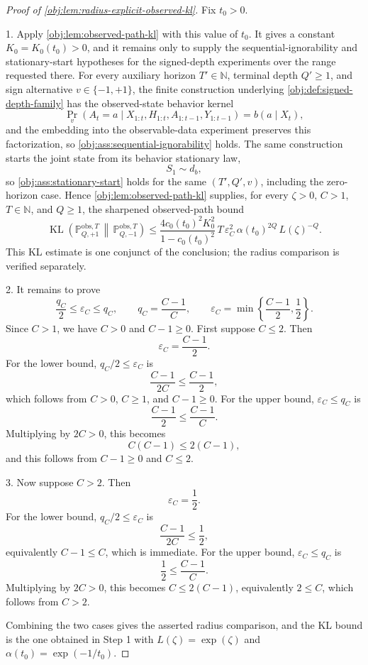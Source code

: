 \documentclass[11pt]{article}
\begin{document}
\begin{proof}[Proof of \cref{obj:lem:radius-explicit-observed-kl}]
Fix \(t_0>0\).

1.  Apply \cref{obj:lem:observed-path-kl} with this value of \(t_0\).  It gives a constant \(K_0=K_0(t_0)>0\), and it remains only to supply the sequential-ignorability and stationary-start hypotheses for the signed-depth experiments over the range requested there.  For every auxiliary horizon \(T'\in\mathbb N\), terminal depth \(Q'\ge1\), and sign alternative \(v\in\{-1,+1\}\), the finite construction underlying \cref{obj:def:signed-depth-family} has the observed-state behavior kernel
\[
\Pr_v\!\left(A_t=a\mid X_{1:t},H_{1:t},A_{1:t-1},Y_{1:t-1}\right)=b(a\mid X_t),
\]
and the embedding into the observable-data experiment preserves this factorization, so \cref{obj:ass:sequential-ignorability} holds.  The same construction starts the joint state from its behavior stationary law,
\[
S_1\sim d_b,
\]
so \cref{obj:ass:stationary-start} holds for the same \((T',Q',v)\), including the zero-horizon case.  Hence \cref{obj:lem:observed-path-kl} supplies, for every \(\zeta>0\), \(C>1\), \(T\in\mathbb N\), and \(Q\ge1\), the sharpened observed-path bound
\[
\operatorname{KL}\!\left(
\mathbb P_{Q,+1}^{\mathrm{obs},T}\,\middle\|\,
\mathbb P_{Q,-1}^{\mathrm{obs},T}
\right)
\le
\frac{4c_0(t_0)^2K_0^2}{1-c_0(t_0)^2}\,
T\,\varepsilon_C^2\,\alpha(t_0)^{2Q}\,L(\zeta)^{-Q}.
\]
This KL estimate is one conjunct of the conclusion; the radius comparison is verified separately. %

2.  It remains to prove
\[
\frac{q_C}{2}\le \varepsilon_C\le q_C,
\qquad
q_C=\frac{C-1}{C},
\qquad
\varepsilon_C=\min\left\{\frac{C-1}{2},\frac12\right\}.
\]
Since \(C>1\), we have \(C>0\) and \(C-1\ge0\).  First suppose \(C\le2\).  Then
\[
\varepsilon_C=\frac{C-1}{2}.
\]
For the lower bound, \(q_C/2\le\varepsilon_C\) is
\[
\frac{C-1}{2C}\le\frac{C-1}{2},
\]
which follows from \(C>0\), \(C\ge1\), and \(C-1\ge0\).  For the upper bound, \(\varepsilon_C\le q_C\) is
\[
\frac{C-1}{2}\le\frac{C-1}{C}.
\]
Multiplying by \(2C>0\), this becomes
\[
C(C-1)\le2(C-1),
\]
and this follows from \(C-1\ge0\) and \(C\le2\). %

3.  Now suppose \(C>2\).  Then
\[
\varepsilon_C=\frac12.
\]
For the lower bound, \(q_C/2\le\varepsilon_C\) is
\[
\frac{C-1}{2C}\le\frac12,
\]
equivalently \(C-1\le C\), which is immediate.  For the upper bound, \(\varepsilon_C\le q_C\) is
\[
\frac12\le\frac{C-1}{C}.
\]
Multiplying by \(2C>0\), this becomes \(C\le2(C-1)\), equivalently \(2\le C\), which follows from \(C>2\). %

Combining the two cases gives the asserted radius comparison, and the KL bound is the one obtained in Step 1 with \(L(\zeta)=\exp(\zeta)\) and \(\alpha(t_0)=\exp(-1/t_0)\). %
\end{proof}
\end{document}
